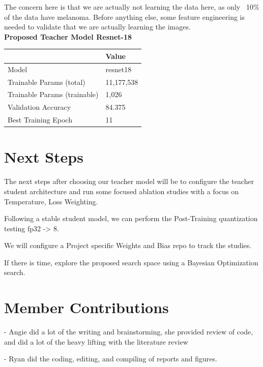 \documentclass[conference]{IEEEtran}
\begin{document}
The concern here is that we are actually not learning the data here, as only ~10\% of the data have melanoma. Before anything else, some feature engineering is needed to validate that we are actually learning the images. \\

\textbf{Proposed Teacher Model Resnet-18}\\
\centering
\begin{tabular}{ll}
\hline
 & Value \\
\hline
Model & resnet18 \\
Trainable Params (total) & 11,177,538 \\
Trainable Params (trainable) & 1,026 \\
Validation Accuracy & 84.375 \\
Best Training Epoch & 11 \\
\hline
\end{tabular}


\section*{Next Steps}

The next steps after choosing our teacher model will be to configure the teacher student architecture and run some focused ablation studies with a focus on Temperature, Loss Weighting.

Following a stable student model, we can perform the Post-Training quantization testing fp32 -> 8.

We will configure a Project specific Weights and Bias repo to track the studies.

If there is time, explore the proposed search space using a Bayesian Optimization search.

\section*{Member Contributions}

- Angie did a lot of the writing and brainstorming, she provided review of code, and did a lot of the heavy lifting with the literature review

- Ryan did the coding, editing, and compiling of reports and figures. 
\end{document}
